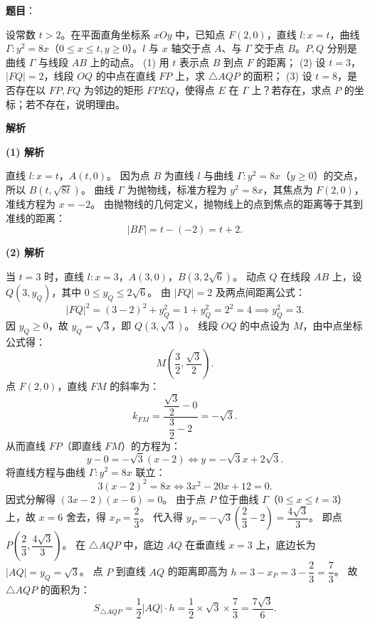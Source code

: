 \begin{answer}

\textbf{题目}：

设常数 $t > 2$。在平面直角坐标系 $xOy$ 中，已知点 $F(2, 0)$，直线 $l: x = t$，曲线 $\Gamma: y^2 = 8x$（$0 \le x \le t, y \ge 0$）。$l$ 与 $x$ 轴交于点 $A$、与 $\Gamma$ 交于点 $B$。$P, Q$ 分别是曲线 $\Gamma$ 与线段 $AB$ 上的动点。
(1) 用 $t$ 表示点 $B$ 到点 $F$ 的距离；
(2) 设 $t = 3$，$|FQ| = 2$，线段 $OQ$ 的中点在直线 $FP$ 上，求 $\triangle AQP$ 的面积；
(3) 设 $t = 8$，是否存在以 $FP, FQ$ 为邻边的矩形 $FPEQ$，使得点 $E$ 在 $\Gamma$ 上？若存在，求点 $P$ 的坐标；若不存在，说明理由。

\textbf{解析}

\textbf{(1) 解析}

直线 $l: x = t$，$A(t, 0)$。
因为点 $B$ 为直线 $l$ 与曲线 $\Gamma: y^2 = 8x$（$y \ge 0$）的交点，所以 $B(t, \sqrt{8t})$。
曲线 $\Gamma$ 为抛物线，标准方程为 $y^2 = 8x$，其焦点为 $F(2, 0)$，准线方程为 $x = -2$。
由抛物线的几何定义，抛物线上的点到焦点的距离等于其到准线的距离：
\nopagebreak[4]
\[|BF| = t - (-2) = t + 2.\]

\textbf{(2) 解析}

当 $t = 3$ 时，直线 $l: x = 3$，$A(3, 0)$，$B(3, 2\sqrt{6})$。
动点 $Q$ 在线段 $AB$ 上，设 $Q(3, y_Q)$，其中 $0 \le y_Q \le 2\sqrt{6}$。
由 $|FQ| = 2$ 及两点间距离公式：
\nopagebreak[4]
\[|FQ|^2 = (3 - 2)^2 + y_Q^2 = 1 + y_Q^2 = 2^2 = 4 \implies y_Q^2 = 3.\]
因 $y_Q \ge 0$，故 $y_Q = \sqrt{3}$，即 $Q(3, \sqrt{3})$。
线段 $OQ$ 的中点设为 $M$，由中点坐标公式得：
\nopagebreak[4]
\[M\left(\frac{3}{2}, \frac{\sqrt{3}}{2}\right).\]
点 $F(2, 0)$，直线 $FM$ 的斜率为：
\nopagebreak[4]
\[k_{FM} = \frac{\dfrac{\sqrt{3}}{2} - 0}{\dfrac{3}{2} - 2} = -\sqrt{3}.\]
从而直线 $FP$（即直线 $FM$）的方程为：
\nopagebreak[4]
\[y - 0 = -\sqrt{3}(x - 2) \iff y = -\sqrt{3}x + 2\sqrt{3}.\]
将直线方程与曲线 $\Gamma: y^2 = 8x$ 联立：
\nopagebreak[4]
\[3(x - 2)^2 = 8x \iff 3x^2 - 20x + 12 = 0.\]
因式分解得 $(3x - 2)(x - 6) = 0$。
由于点 $P$ 位于曲线 $\Gamma$（$0 \le x \le t = 3$）上，故 $x = 6$ 舍去，得 $x_P = \dfrac{2}{3}$。
代入得 $y_P = -\sqrt{3}\left(\dfrac{2}{3} - 2\right) = \dfrac{4\sqrt{3}}{3}$。
即点 $P\left(\dfrac{2}{3}, \dfrac{4\sqrt{3}}{3}\right)$。
在 $\triangle AQP$ 中，底边 $AQ$ 在垂直线 $x = 3$ 上，底边长为 $|AQ| = y_Q = \sqrt{3}$。
点 $P$ 到直线 $AQ$ 的距离即高为 $h = 3 - x_P = 3 - \dfrac{2}{3} = \dfrac{7}{3}$。
故 $\triangle AQP$ 的面积为：
\nopagebreak[4]
\[S_{\triangle AQP} = \frac{1}{2} |AQ| \cdot h = \frac{1}{2} \times \sqrt{3} \times \frac{7}{3} = \frac{7\sqrt{3}}{6}.\]


\end{answer}
